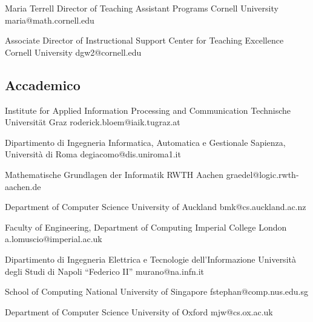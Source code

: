\documentclass[10pt,a4paper,sans]{moderncv}
\begin{document}
{Maria Terrell}
{Director of Teaching Assistant Programs}
{Cornell University}
{}
{maria@math.cornell.edu}


{Associate Director of Instructional Support}
{Center for Teaching Excellence}
{Cornell University}
{dgw2@cornell.edu}

% 


\subsection{Accademico}

{Institute for Applied Information Processing and Communication}
{Technische Universit\"at Graz}
{}
{roderick.bloem@iaik.tugraz.at}

{Dipartimento di Ingegneria Informatica, Automatica e Gestionale} 
{Sapienza, Universit\`a di Roma}
{}
{degiacomo@dis.uniroma1.it}

{Mathematische Grundlagen der Informatik}
{RWTH Aachen}
{}
{graedel@logic.rwth-aachen.de}

{Department of Computer Science}
{University of Auckland}
{}
{bmk@cs.auckland.ac.nz}

{Faculty of Engineering, 
Department of Computing}
{Imperial College London}
{}
{a.lomuscio@imperial.ac.uk}

{Dipartimento di Ingegneria Elettrica e Tecnologie dell'Informazione} 
{Universit\`a degli Studi di Napoli ``Federico II''}
{}
{murano@na.infn.it}


{School of Computing}
{National University of Singapore}
{}
{fstephan@comp.nus.edu.sg}

{Department of Computer Science}
{University of Oxford}
{}
{mjw@cs.ox.ac.uk}
\fi
\end{document}
